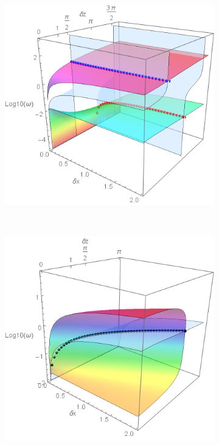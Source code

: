 \documentclass[a4paper,11pt]{article}
\begin{document}
\begin{figure}[!h]
	\centering		
	\begin{subfigure}{0.45\linewidth}
		\includegraphics[width=1\linewidth]{FIGURES/Fig_Inter_Real.png}
		\caption{}
	\end{subfigure}
	~
	\centering
	\begin{subfigure}{0.45\linewidth}
		\includegraphics[width=1\linewidth]{FIGURES/Fig_Inter_Imag.png}
		\caption{}
	\end{subfigure}
	

\end{figure}
\end{document}
